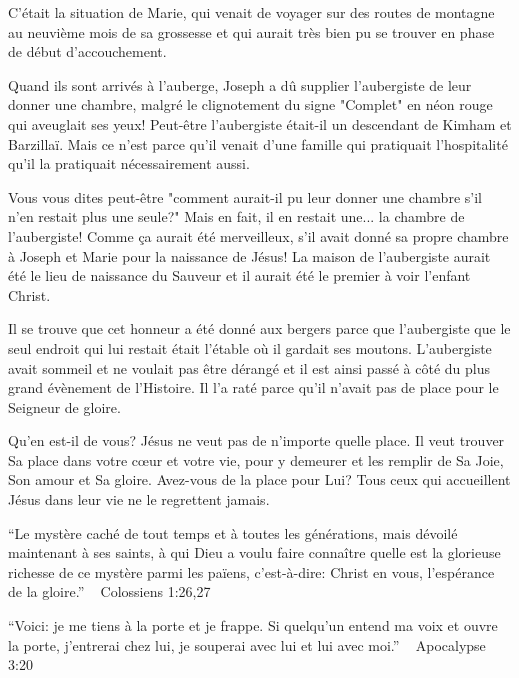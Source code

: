 C'était la situation de Marie, qui venait de voyager sur des routes de montagne au neuvième mois de sa grossesse et qui aurait très bien pu se trouver en phase de début d'accouchement.

Quand ils sont arrivés à l'auberge, Joseph a dû supplier l'aubergiste de leur donner une chambre, malgré le clignotement du signe "Complet" en néon rouge qui aveuglait ses yeux! Peut-être l'aubergiste était-il un descendant de Kimham et Barzillaï. Mais ce n'est parce qu'il venait d'une famille qui pratiquait l'hospitalité qu'il la pratiquait nécessairement aussi.

Vous vous dites peut-être "comment aurait-il pu leur donner une chambre s'il n'en restait plus une seule?" Mais en fait, il en restait une... la chambre de l'aubergiste! Comme ça aurait été merveilleux, s'il avait donné sa propre chambre à Joseph et Marie pour la naissance de Jésus! La maison de l'aubergiste aurait été le lieu de naissance du Sauveur et il aurait été le premier à voir l'enfant Christ.

Il se trouve que cet honneur a été donné aux bergers parce que l'aubergiste que le seul endroit qui lui restait était l'étable où il gardait ses moutons. L'aubergiste avait sommeil et ne voulait pas être dérangé et il est ainsi passé à côté du plus grand évènement de l'Histoire. Il l'a raté parce qu'il n'avait pas de place pour le Seigneur de gloire.

Qu'en est-il de vous? Jésus ne veut pas de n'importe quelle place. Il veut trouver Sa place dans votre cœur et votre vie, pour y demeurer et les remplir de Sa Joie, Son amour et Sa gloire. Avez-vous de la place pour Lui? Tous ceux qui accueillent Jésus dans leur vie ne le regrettent jamais.


“Le mystère caché de tout temps et à toutes les générations, mais dévoilé maintenant à ses saints, à qui Dieu a voulu faire connaître quelle est la glorieuse richesse de ce mystère parmi les païens, c’est-à-dire: Christ en vous, l’espérance de la gloire.” ~ Colossiens 1:26,27

“Voici: je me tiens à la porte et je frappe. Si quelqu’un entend ma voix et ouvre la porte, j’entrerai chez lui, je souperai avec lui et lui avec moi.” ~ Apocalypse 3:20

